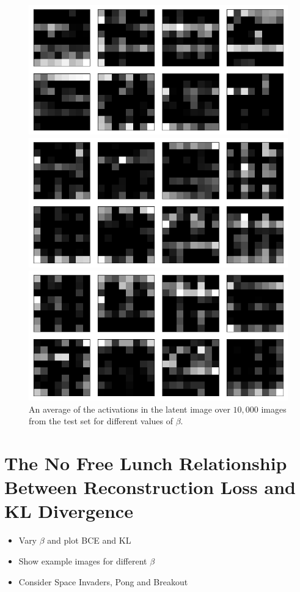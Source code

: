 \begin{figure}[h!]
\centering
\captionsetup{justification=centering}

    \includegraphics[scale=0.42]{figures/results/colour_separated/beta_1_average_activation.png}
    \caption{$\beta=1$}
    \includegraphics[scale=0.42]{figures/results/colour_separated/beta_2_average_activation.png}
    \caption{$\beta=2$}
    \includegraphics[scale=0.42]{figures/results/colour_separated/beta_4_average_activation.png}
    \caption{$\beta=4$}

\caption{An average of the activations in the latent image over $10,000$ images from the test set for different values of $\beta$.}
\label{fig:weighted_average_originals_posterior_samples}
\end{figure}


%
%
%
%
%
\section{The No Free Lunch Relationship Between Reconstruction Loss and KL Divergence}

\begin{itemize}
\item Vary $\beta$ and plot BCE and KL
\item Show example images for different $\beta$
\item Consider Space Invaders, Pong and Breakout
\end{itemize}
